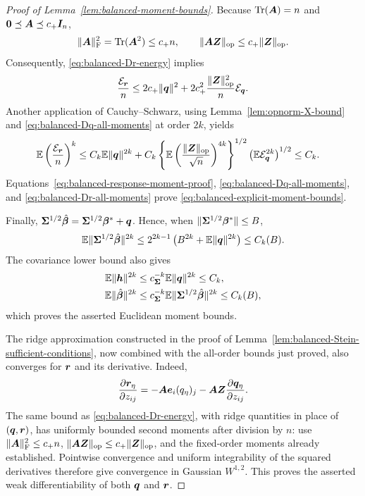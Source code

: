 \documentclass{article}
\theoremstyle{plain} %
\theoremstyle{definition} %
\theoremstyle{definition} %
\begin{document}
\begin{proof}[Proof of Lemma~\ref{lem:balanced-moment-bounds}]
Because $\operatorname{Tr}(\boldsymbol{A})=n$ and
$\mathbf{0}\preceq\boldsymbol{A}\preceq c_+\boldsymbol{I}_n$,
\begin{align*}
    \lVert\boldsymbol{A}\rVert_{\rm F}^2
    =\operatorname{Tr}(\boldsymbol{A}^2)\leq c_+n,
    \qquad
    \lVert\boldsymbol{A}\boldsymbol{Z}\rVert_{\rm op}\leq c_+\lVert\boldsymbol{Z}\rVert_{\rm op}.
\end{align*}
Consequently, \eqref{eq:balanced-Dr-energy} implies
\begin{align*}
    \frac{{\mathcal E}_{\boldsymbol{r}}}{n}
    \leq 2c_+\lVert\boldsymbol{q}\rVert^2
       +2c_+^2\frac{\lVert\boldsymbol{Z}\rVert_{\rm op}^2}{n}{\mathcal E}_{\boldsymbol{q}}.
\end{align*}
Another application of Cauchy--Schwarz, using
Lemma~\ref{lem:opnorm-X-bound} and
\eqref{eq:balanced-Dq-all-moments} at order $2k$, yields
\begin{align}
    {\mathbb{E}}\left(\frac{{\mathcal E}_{\boldsymbol{r}}}{n}\right)^k
    &\leq C_k{\mathbb{E}}\lVert\boldsymbol{q}\rVert^{2k}
       +C_k
        \left\{{\mathbb{E}}\left(
           \frac{\lVert\boldsymbol{Z}\rVert_{\rm op}}{\sqrt n}
        \right)^{4k}\right\}^{1/2}
        \left({\mathbb{E}}{\mathcal E}_{\boldsymbol{q}}^{2k}\right)^{1/2}
     \leq C_k.
    \label{eq:balanced-Dr-all-moments}
\end{align}
Equations~\eqref{eq:balanced-response-moment-proof},
\eqref{eq:balanced-Dq-all-moments}, and
\eqref{eq:balanced-Dr-all-moments} prove
\eqref{eq:balanced-explicit-moment-bounds}.

Finally,
$\boldsymbol{\Sigma}^{1/2}\hat{\boldsymbol{\beta}}{}=\boldsymbol{\Sigma}^{1/2}\boldsymbol{\beta}^*+\boldsymbol{q}$.  Hence, when
$\lVert\boldsymbol{\Sigma}^{1/2}\boldsymbol{\beta}^*\rVert\leq B$,
\begin{align*}
    {\mathbb{E}}\lVert\boldsymbol{\Sigma}^{1/2}\hat{\boldsymbol{\beta}}{}\rVert^{2k}
    \leq 2^{2k-1}\left(B^{2k}+{\mathbb{E}}\lVert\boldsymbol{q}\rVert^{2k}\right)
    \leq C_k(B).
\end{align*}
The covariance lower bound also gives
\begin{align*}
    {\mathbb{E}}\lVert\boldsymbol{h}\rVert^{2k}
    &\leq c_{\boldsymbol{\Sigma}}^{-k}{\mathbb{E}}\lVert\boldsymbol{q}\rVert^{2k}\leq C_k,\\
    {\mathbb{E}}\lVert\hat{\boldsymbol{\beta}}{}\rVert^{2k}
    &\leq c_{\boldsymbol{\Sigma}}^{-k}
       {\mathbb{E}}\lVert\boldsymbol{\Sigma}^{1/2}\hat{\boldsymbol{\beta}}{}\rVert^{2k}
      \leq C_k(B),
\end{align*}
which proves the asserted Euclidean moment bounds.

The ridge approximation constructed in the proof of
Lemma~\ref{lem:balanced-Stein-sufficient-conditions}, now combined with the
all-order bounds just proved, also converges for $\boldsymbol{r}$ and its derivative.
Indeed,
\begin{align*}
    \pdv{\boldsymbol{r}_\eta}{z_{ij}}
    =-\boldsymbol{A}\boldsymbol{e}_i(q_\eta)_j
      -\boldsymbol{A}\boldsymbol{Z}\pdv{\boldsymbol{q}_\eta}{z_{ij}}.
\end{align*}
The same bound as \eqref{eq:balanced-Dr-energy}, with ridge quantities
in place of $(\boldsymbol{q},\boldsymbol{r})$, has uniformly bounded second moments after
division by $n$: use $\lVert\boldsymbol{A}\rVert_{\rm F}^2\leq c_+n$,
$\lVert\boldsymbol{A}\boldsymbol{Z}\rVert_{\rm op}\leq c_+\lVert\boldsymbol{Z}\rVert_{\rm op}$, and the fixed-order
moments already established.  Pointwise convergence and uniform
integrability of the squared derivatives therefore give convergence in
Gaussian $W^{1,2}$.  This proves the asserted weak differentiability
of both $\boldsymbol{q}$ and $\boldsymbol{r}$.
\end{proof}
\end{document}
